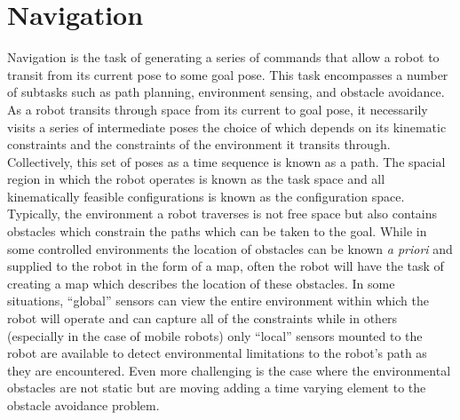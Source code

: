 
\chapter{Navigation}\label{ch:navigation}

Navigation is the task of generating a series of commands that allow a robot to transit from its current pose
to some goal pose. This task encompasses a number of subtasks such as path planning, environment sensing, and obstacle
avoidance. As a robot transits through space from its current to goal pose, it necessarily visits a series
of intermediate poses the choice of which depends on its kinematic constraints and the constraints of the environment it transits through. 
Collectively, this set of poses as a time sequence is known as a path. 
The spacial region in which the robot operates is known as the task space and all kinematically feasible configurations is known as the
configuration space.  Typically, the environment a robot traverses is not free space but also contains obstacles 
which constrain the paths which can be taken to the goal. While in some 
controlled environments the location of obstacles can be known \textit{a priori} and supplied to the robot in the form of a map, often the
robot will have the task of creating a map which describes the location of these obstacles. In some situations, ``global'' 
sensors can view the entire environment within which the robot will operate and can capture all of the constraints while in others (especially
in the case of mobile robots) only ``local'' sensors mounted to the robot are available to detect environmental limitations
to the robot's path as they are encountered. Even more challenging is the case where the environmental obstacles are not
static but are moving adding a time varying element to the obstacle avoidance problem.


